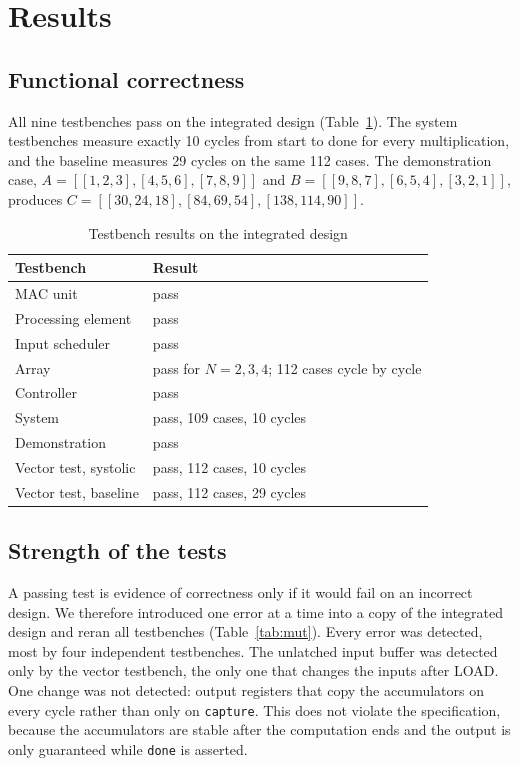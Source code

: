 \documentclass[conference]{IEEEtran}
\newcommand{\code}[1]{\texttt{#1}}
\begin{document}
\section{Results}
\label{sec:results}

\subsection{Functional correctness}
All nine testbenches pass on the integrated design (Table~\ref{tab:tests}). The system testbenches measure exactly 10 cycles from start to done for every multiplication, and the baseline measures 29 cycles on the same 112 cases. The demonstration case, $A = [[1,2,3],[4,5,6],[7,8,9]]$ and $B = [[9,8,7],[6,5,4],[3,2,1]]$, produces $C = [[30,24,18],[84,69,54],[138,114,90]]$.

\begin{table}[t]
\caption{Testbench results on the integrated design}
\label{tab:tests}
\centering
\begin{tabular}{@{}lp{}@{}}
\toprule
Testbench & Result \\
\midrule
MAC unit & pass \\
Processing element & pass \\
Input scheduler & pass \\
Array & pass for $N = 2, 3, 4$; 112 cases cycle by cycle \\
Controller & pass \\
System & pass, 109 cases, 10 cycles \\
Demonstration & pass \\
Vector test, systolic & pass, 112 cases, 10 cycles \\
Vector test, baseline & pass, 112 cases, 29 cycles \\
\bottomrule
\end{tabular}
\end{table}

\subsection{Strength of the tests}
A passing test is evidence of correctness only if it would fail on an incorrect design. We therefore introduced one error at a time into a copy of the integrated design and reran all testbenches (Table~\ref{tab:mut}). Every error was detected, most by four independent testbenches. The unlatched input buffer was detected only by the vector testbench, the only one that changes the inputs after LOAD. One change was not detected: output registers that copy the accumulators on every cycle rather than only on \code{capture}. This does not violate the specification, because the accumulators are stable after the computation ends and the output is only guaranteed while \code{done} is asserted.
\end{document}
